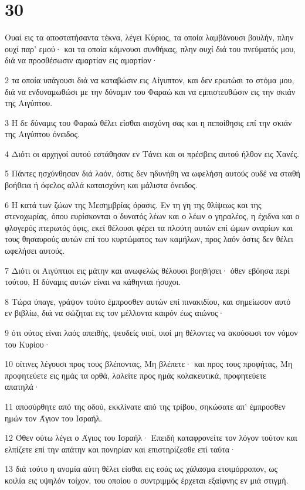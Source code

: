 \chapter{30}

\par Ουαί εις τα αποστατήσαντα τέκνα, λέγει Κύριος, τα οποία λαμβάνουσι βουλήν, πλην ουχί παρ' εμού· και τα οποία κάμνουσι συνθήκας, πλην ουχί διά του πνεύματός μου, διά να προσθέσωσιν αμαρτίαν εις αμαρτίαν·
\par 2 τα οποία υπάγουσι διά να καταβώσιν εις Αίγυπτον, και δεν ερωτώσι το στόμα μου, διά να ενδυναμωθώσι με την δύναμιν του Φαραώ και να εμπιστευθώσιν εις την σκιάν της Αιγύπτου.
\par 3 Η δε δύναμις του Φαραώ θέλει είσθαι αισχύνη σας και η πεποίθησις επί την σκιάν της Αιγύπτου όνειδος.
\par 4 Διότι οι αρχηγοί αυτού εστάθησαν εν Τάνει και οι πρέσβεις αυτού ήλθον εις Χανές.
\par 5 Πάντες ησχύνθησαν διά λαόν, όστις δεν ηδυνήθη να ωφελήση αυτούς ουδέ να σταθή βοήθεια ή όφελος αλλά καταισχύνη και μάλιστα όνειδος.
\par 6 Η κατά των ζώων της Μεσημβρίας όρασις. Εν τη γη της θλίψεως και της στενοχωρίας, όπου ευρίσκονται ο δυνατός λέων και ο λέων ο γηραλέος, η έχιδνα και ο φλογερός πτερωτός όφις, εκεί θέλουσι φέρει τα πλούτη αυτών επί ώμων οναρίων και τους θησαυρούς αυτών επί του κυρτώματος των καμήλων, προς λαόν όστις δεν θέλει ωφελήσει αυτούς.
\par 7 Διότι οι Αιγύπτιοι εις μάτην και ανωφελώς θέλουσι βοηθήσει· όθεν εβόησα περί τούτου, Η δύναμις αυτών είναι να κάθηνται ήσυχοι.
\par 8 Τώρα ύπαγε, γράψον τούτο έμπροσθεν αυτών επί πινακιδίου, και σημείωσον αυτό εν βιβλίω, διά να σώζηται εις τον μέλλοντα καιρόν έως αιώνος·
\par 9 ότι ούτος είναι λαός απειθής, ψευδείς υιοί, υιοί μη θέλοντες να ακούσωσι τον νόμον του Κυρίου·
\par 10 οίτινες λέγουσι προς τους βλέποντας, Μη βλέπετε· και προς τους προφήτας, Μη προφητεύετε εις ημάς τα ορθά, λαλείτε προς ημάς κολακευτικά, προφητεύετε απατηλά·
\par 11 αποσύρθητε από της οδού, εκκλίνατε από της τρίβου, σηκώσατε απ' έμπροσθεν ημών τον Άγιον του Ισραήλ.
\par 12 Όθεν ούτω λέγει ο Άγιος του Ισραήλ· Επειδή καταφρονείτε τον λόγον τούτον και ελπίζετε επί την απάτην και πονηρίαν και επιστηρίζεσθε επί ταύτα·
\par 13 διά τούτο η ανομία αύτη θέλει είσθαι εις εσάς ως χάλασμα ετοιμόρροπον, ως κοιλία εις υψηλόν τοίχον, του οποίου ο συντριμμός έρχεται εξαίφνης εν μιά στιγμή.
